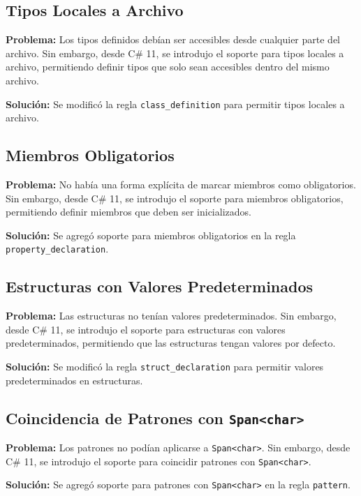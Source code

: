 \subsection*{Tipos Locales a Archivo}

\textbf{Problema:} Los tipos definidos debían ser accesibles desde cualquier parte del archivo. Sin embargo, desde C\# 11, se introdujo el soporte para tipos locales a archivo, permitiendo definir tipos que solo sean accesibles dentro del mismo archivo.

\textbf{Solución:} Se modificó la regla \texttt{class\_definition} para permitir tipos locales a archivo.

\subsection*{Miembros Obligatorios}

\textbf{Problema:} No había una forma explícita de marcar miembros como obligatorios. Sin embargo, desde C\# 11, se introdujo el soporte para miembros obligatorios, permitiendo definir miembros que deben ser inicializados.

\textbf{Solución:} Se agregó soporte para miembros obligatorios en la regla \texttt{property\_declaration}.

\subsection*{Estructuras con Valores Predeterminados}

\textbf{Problema:} Las estructuras no tenían valores predeterminados. Sin embargo, desde C\# 11, se introdujo el soporte para estructuras con valores predeterminados, permitiendo que las estructuras tengan valores por defecto.

\textbf{Solución:} Se modificó la regla \texttt{struct\_declaration} para permitir valores predeterminados en estructuras.

\subsection*{Coincidencia de Patrones con \texttt{Span\textless char\textgreater}}

\textbf{Problema:} Los patrones no podían aplicarse a \texttt{Span\textless char\textgreater}. Sin embargo, desde C\# 11, se introdujo el soporte para coincidir patrones con \texttt{Span\textless char\textgreater}.

\textbf{Solución:} Se agregó soporte para patrones con \texttt{Span\textless char\textgreater} en la regla \texttt{pattern}.

